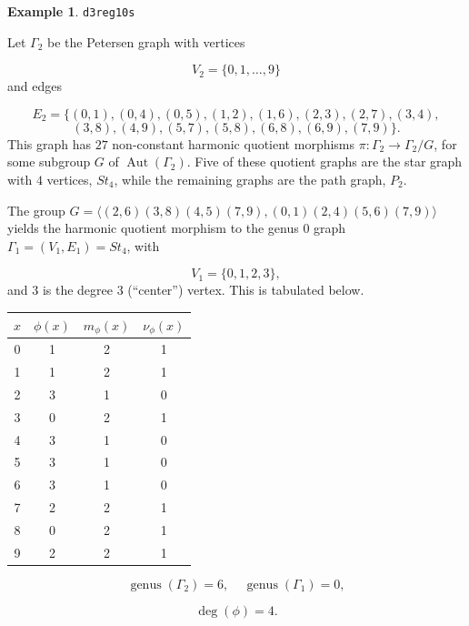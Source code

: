 \documentclass[12pt,letterpaper]{article}
\theoremstyle{definition}
\newtheorem{example}[theorem]{Example}
\DeclareMathOperator{\Aut}{Aut}
\DeclareMathOperator{\genus}{genus}
\begin{document}
\begin{example}%
\label{example:d3reg10s}
  {\tt d3reg10s}\newline
{\rm  
Let $\Gamma_2$ be the Petersen graph with vertices

\[
V_2=\{0,1,\dots,9\}
\]
and edges

\[
E_2 = \{
(0, 1), (0, 4), (0, 5), (1, 2), (1, 6), (2, 3), (2, 7), (3, 4),
\]
\[
(3, 8), (4, 9), (5, 7), (5, 8), (6, 8), (6, 9), (7, 9)
\}.
\]
This graph has $27$ non-constant harmonic quotient
morphisms $\pi: \Gamma_2\to \Gamma_2/G$, for some subgroup
$G$ of $\Aut(\Gamma_2)$. Five of these quotient graphs are 
the star graph with $4$ vertices, $St_4$, while the remaining
graphs are the path graph, $P_2$.

The group
$G = \langle (2,6)(3,8)(4,5)(7,9), (0,1)(2,4)(5,6)(7,9) \rangle$ yields the
harmonic quotient morphism to the genus $0$ graph
$\Gamma_1 = (V_1,E_1) = St_4$, with

\[
V_1=\{0, 1, 2, 3\},
\]
and $3$ is the degree $3$ (``center'') vertex.
This is tabulated below.

\begin{center}
\begin{tabular}{c|c|c|c}  
  $x$ & $\phi(x)$ & $m_\phi(x)$ & $\nu_\phi(x)$ \\ \hline
  0   &    1   &        2         &  1   \\ 
  1   &    1   &        2         &  1   \\ 
  2   &    3   &        1         &  0   \\ 
  3   &    0   &        2         &  1   \\ 
  4   &    3   &        1         &  0   \\ 
  5   &    3   &        1         &  0    \\ 
  6   &    3   &        1         &  0   \\ 
  7   &    2   &        2         &  1   \\
  8   &    0   &        2         &  1   \\
  9   &    2   &        2         &  1   \\ 
\end{tabular}
\end{center}

\[
  \genus(\Gamma_2) =6,\ \ \ \ \
  \genus(\Gamma_1) =0,
\]

\[
\deg(\phi) =4.
\]

}
\end{example}
\end{document}
